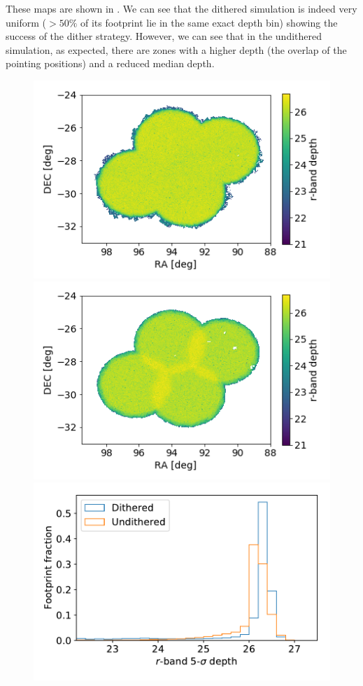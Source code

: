 \documentclass[twocolumn]{aastex62}
\begin{document}
These maps are shown in . We can see that the dithered simulation is indeed very uniform ($> 50\%$ of its footprint lie in the same exact depth bin) showing the success of the dither strategy. However, we can see that in the undithered simulation, as expected, there are zones with a higher depth (the overlap of the pointing positions) and a reduced median depth.
\begin{figure}
\centering
\includegraphics[width=0.9\columnwidth]{dithered_depth.png}
\includegraphics[width=0.9\columnwidth]{undithered_depth.png}
\includegraphics[width=0.9\columnwidth]{depth_comparison_1d.pdf}

\end{figure}
\end{document}
